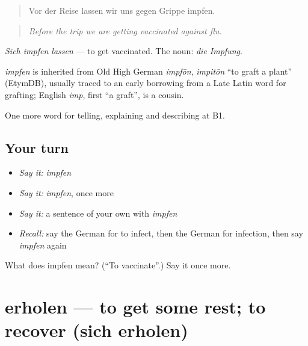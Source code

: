 \begin{quote}
Vor der Reise lassen wir uns gegen Grippe impfen.
\end{quote}

\begin{quote}
\emph{Before the trip we are getting vaccinated against flu.}
\end{quote}

\emph{Sich impfen lassen} — to get vaccinated. The noun: \emph{die Impfung}.

\begin{cousinweb}
\emph{impfen} is inherited from Old High German \emph{impfōn}, \emph{impitōn} \textquotedblleft{}to graft a plant\textquotedblright{} (EtymDB), usually traced to an early borrowing from a Late Latin word for grafting; English \emph{imp}, first \textquotedblleft{}a graft\textquotedblright{}, is a cousin.
\end{cousinweb}

\begin{grammarlens}[title={What you've built}]
One more word for telling, explaining and describing at B1.
\end{grammarlens}

\subsection*{Your turn}
\begin{itemize}
\raggedright
  \item \emph{Say it:} \emph{impfen}
  \item \emph{Say it:} \emph{impfen}, once more
  \item \emph{Say it:} a sentence of your own with \emph{impfen}
  \item \emph{Recall:} say the German for to infect, then the German for infection, then say \emph{impfen} again
\end{itemize}

\begin{tcolorbox}[breakable,colback=teal!4,colframe=teal!35!black,title={Before you move on}]
What does impfen mean? (\textquotedblleft{}To vaccinate\textquotedblright{}.) Say it once more.
\end{tcolorbox}
\section[erholen]{erholen — to get some rest; to recover (sich erholen)}

\label{lesson:GE-C488-erholen}



